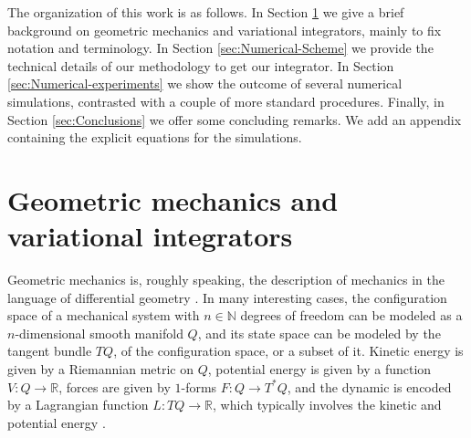 \documentclass{aims}
\numberwithin{equation}{section}
\theoremstyle{definition}
\begin{document}
The organization of this work is as follows. In Section \ref{sec:Background} we give a brief background on geometric mechanics and variational integrators, mainly to fix notation and terminology. In Section \ref{sec:Numerical-Scheme} we provide the technical details of our methodology to get our integrator. In Section \ref{sec:Numerical-experiments} we show the outcome of several numerical simulations, contrasted with a couple of more standard procedures. Finally, in Section \ref{sec:Conclusions} we offer some concluding remarks. We add an appendix containing the explicit equations for the simulations.


\section{Geometric mechanics and variational integrators} \label{sec:Background}

Geometric mechanics is, roughly speaking, the description of mechanics in the language of differential geometry \cite{holm2011geometric-I, holm2011geometric-II, holm2009geometric-symmetry, marsden2008foundations, marsden1999introduction}. In many interesting cases, the configuration space of a mechanical system with $n\in \mathbb{N}$ degrees of freedom can be modeled as a $n$-dimensional smooth manifold $Q$, and its state space can be modeled by the tangent bundle $TQ$, of the configuration space, or a subset of it. Kinetic energy is given by a Riemannian metric on $Q$, potential energy is given by a function $V\colon Q\to\mathbb{R}$, forces are given by $1$-forms $F\colon Q\to T^*Q$, and the dynamic is encoded by a Lagrangian function $L\colon TQ \to \mathbb{R}$, which typically involves the kinetic and potential energy \cite{bloch2015nonholonomic,marsden1999introduction}.
\end{document}
